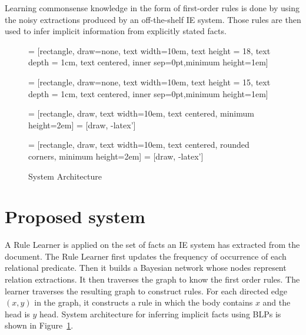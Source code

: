 \documentclass[12pt,a4paper]{article}
\begin{document}
Learning commonsense knowledge in the form of first-order rules is
done by using the noisy extractions produced by an off-the-shelf IE
system. Those rules are then used to infer implicit information from
explicitly stated facts.

\begin{figure}[H]
  \centering

   = [rectangle, draw=none, text width=10em, text height
  = 18, text depth = 1cm, text centered, inner sep=0pt,minimum
  height=1em]

   = [rectangle, draw=none, text width=10em, text
  height = 15, text depth = 1cm, text centered, inner sep=0pt,minimum
  height=1em]

   = [rectangle, draw, text width=10em, text centered,
  minimum height=2em]  = [draw, -latex']

   = [rectangle, draw, text width=10em, text
  centered, rounded corners, minimum height=2em]  =
  [draw, -latex']
    
  \caption{System Architecture}
  \label{arch}
\end{figure}

\section{Proposed system}

A Rule Learner is applied on the set of facts an IE system has
extracted from the document. The Rule Learner first updates the
frequency of occurrence of each relational predicate. Then it builds a
Bayesian network whose nodes represent relation extractions. It then
traverses the graph to know the first order rules. The learner
traverses the resulting graph to construct rules. For each directed
edge $(x,y)$ in the graph, it constructs a rule in which the body
contains $x$ and the head is $y$ head. System architecture for
inferring implicit facts using BLPs is shown in Figure~\ref{arch}.
\end{document}
